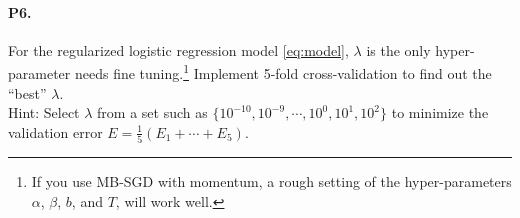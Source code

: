 \documentclass[11pt]{article}
\numberwithin{equation}{section}
\begin{document}
\paragraph{P6.}
For the regularized logistic regression model \eqref{eq:model}, 
$\lambda$ is the only hyper-parameter needs fine tuning.\footnote{If you use MB-SGD with momentum, a rough setting of the hyper-parameters $\alpha$, $\beta$, $b$, and $T$, will work well.}
Implement 5-fold cross-validation to find out the ``best'' $\lambda$.\\
Hint: Select $\lambda$ from a set such as $\{ 10^{-10}, 10^{-9}, \cdots, 10^{0}, 10^1, 10^2 \}$ to minimize the validation error $E = \frac{1}{5} (E_1 + \cdots + E_5)$.



%

%
%
%
\end{document}
